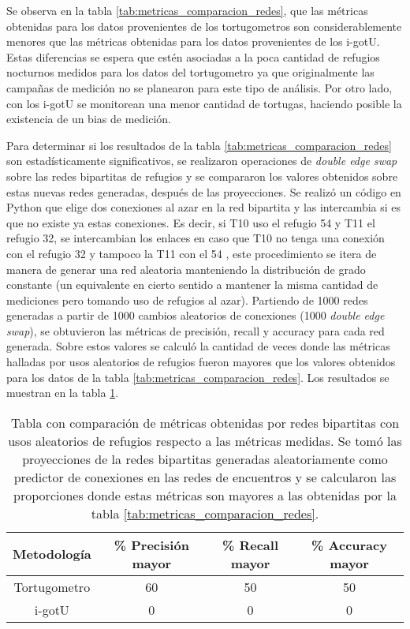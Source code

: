 Se observa en la tabla \ref{tab:metricas_comparacion_redes}, que las métricas obtenidas para los datos provenientes de los tortugometros son considerablemente menores que las métricas obtenidas para los datos provenientes de los i-gotU. Estas diferencias se espera que estén asociadas a la poca cantidad de refugios nocturnos medidos para los datos del tortugometro ya que originalmente las campañas de medición no se planearon para este tipo de análisis. Por otro lado, con los i-gotU se monitorean una menor cantidad de tortugas, haciendo posible la existencia de un bias de medición.
 
Para determinar si los resultados de la tabla \ref{tab:metricas_comparacion_redes} son estadísticamente significativos, se realizaron operaciones de \textit{double edge swap} sobre las redes bipartitas de refugios y se compararon los valores obtenidos sobre estas nuevas redes generadas, después de las proyecciones. Se realizó un código en Python que elige dos conexiones al azar en la red bipartita y las intercambia si es que no existe ya estas conexiones. Es decir, si T10 uso el refugio 54 y T11 el refugio 32, se intercambian los enlaces en caso que T10 no tenga una conexión con el refugio 32 y tampoco la T11 con el 54 \cite{github}, este procedimiento se itera de manera de generar una red aleatoria manteniendo la distribución de grado constante (un equivalente en cierto sentido a mantener la misma cantidad de mediciones pero tomando uso de refugios al azar). Partiendo de 1000 redes generadas a partir de 1000 cambios aleatorios de conexiones (1000 \textit{double edge swap}), se obtuvieron las métricas de precisión, recall y accuracy para cada red generada. Sobre estos valores se calculó la cantidad de veces donde las métricas halladas por usos aleatorios de refugios fueron mayores que los valores obtenidos para los datos de la tabla \ref{tab:metricas_comparacion_redes}. Los resultados se muestran en la tabla \ref{tab:metricas_comparacion_redes_aleatorias}.
\begin{table}[ht]
    \centering
    \begin{tabular}{|c|c|c|c|}
       
   \hline
    Metodología  & \% Precisión mayor  &  \% Recall mayor & \% Accuracy mayor \\ \hline
    Tortugometro & 60    & 50  & 50    \\ \hline
    i-gotU       & 0        & 0    & 0      \\ \hline
   
    \end{tabular}
    \caption[Tabla con comparación de métricas obtenidas en redes bipartitas con usos aleatorios de refugios respecto a las métricas medidas.]{Tabla con comparación de métricas obtenidas por redes bipartitas con usos aleatorios de refugios respecto a las métricas medidas. Se tomó las proyecciones de la redes bipartitas generadas aleatoriamente como predictor de conexiones en las redes de encuentros y se calcularon las proporciones donde estas métricas son mayores a las obtenidas por la tabla \ref{tab:metricas_comparacion_redes}.}
    \label{tab:metricas_comparacion_redes_aleatorias}
\end{table}

